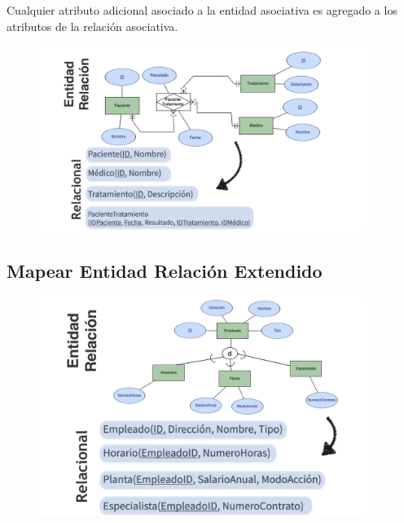 \documentclass[12pt, fleqn]{report}                             %
\begin{document}
                Cualquier atributo adicional asociado a la entidad asociativa es agregado a los atributos de
                la relación asociativa.

                \begin{figure}[h]
                    \centering
                    \includegraphics[width=0.95\textwidth]{MapeoRelacionesNArias}
                \end{figure}


            \clearpage
            \subsection{Mapear Entidad Relación Extendido}

                \begin{figure}[h]
                    \centering
                    \includegraphics[width=0.95\textwidth]{MapeoEntidadRelacionExtendido}
                \end{figure}
\end{document}
